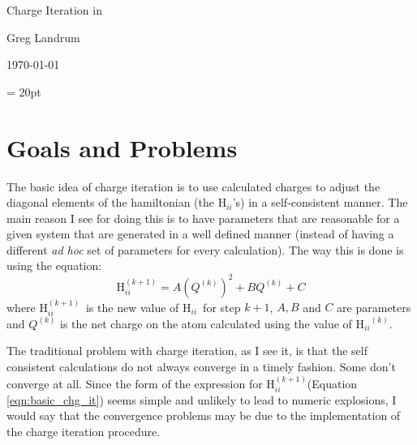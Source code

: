 
\newcommand {\progname}[1] {\mbox {\bf {\sf #1}}}
\newcommand {\Hii} {\mbox {H$_{ii}$}}
\newcommand {\Hiip} {\mbox {H$_{ii}^{(k+1)}$}}
\newcommand {\Hiik} {\mbox {H$_{ii}^{(k)}$}}

\newcommand {\pvar}[1] {\mbox {\sl #1}}

\newenvironment{sampfile}
{ \baselineskip=12pt 
\begin{verbatim}}
{\end{verbatim}}



\begin{center}
{\huge Charge Iteration in \calcprog }

{\large Greg Landrum}

{\large \today}

\end{center}


\baselineskip = 20pt

\section{Goals and Problems}

The basic idea of charge iteration is to use calculated charges to
adjust the diagonal elements of the hamiltonian (the \Hii's) in a
self-consistent manner.  The main reason I see for doing this is to
have parameters that are reasonable for a given system that are
generated in a well defined manner (instead of having a different {\em
ad hoc} set of parameters for every calculation).  The way this is
done is using the equation:
\begin{equation}
\Hiip = A (Q^{(k)})^{2} + B Q^{(k)} + C
\label{eqn:basic_chg_it}
\end{equation}
where \Hiip\ is the new value of \Hii\ for step $k+1$, $A,B$ and $C$ are 
parameters and $Q^{(k)}$ is the net charge on the atom calculated
using the value of $\Hii^{(k)}$.

The traditional problem with charge iteration, as I see it, is that
the self consistent calculations do not always converge in a timely
fashion.  Some don't converge at all.  Since the form of the
expression for \Hiip (Equation \ref{eqn:basic_chg_it}) seems simple
and unlikely to lead to numeric explosions, I would say that the
convergence problems may be due to the implementation of the charge
iteration procedure.

